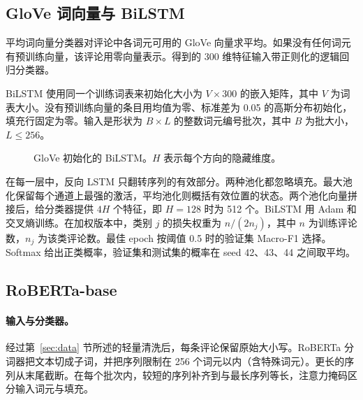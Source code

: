 \documentclass[11pt,a4paper]{article}
\begin{document}
\subsection{GloVe 词向量与 BiLSTM}
平均词向量分类器对评论中各词元可用的 GloVe 向量求平均。如果没有任何词元有预训练向量，该评论用零向量表示。得到的 300 维特征输入带正则化的逻辑回归分类器。

BiLSTM 使用同一个训练词表来初始化大小为 $V \times 300$ 的嵌入矩阵，其中 $V$ 为词表大小。没有预训练向量的条目用均值为零、标准差为 0.05 的高斯分布初始化，填充行固定为零。输入是形状为 $B \times L$ 的整数词元编号批次，其中 $B$ 为批大小，$L \leq 256$。

\begin{figure}[!htbp]
\centering
{}
\caption{GloVe 初始化的 BiLSTM。$H$ 表示每个方向的隐藏维度。}
\label{fig:bilstm}
\end{figure}

在每一层中，反向 LSTM 只翻转序列的有效部分。两种池化都忽略填充。最大池化保留每个通道上最强的激活，平均池化则概括有效位置的状态。两个池化向量拼接后，给分类器提供 $4H$ 个特征，即 $H = 128$ 时为 512 个。BiLSTM 用 Adam 和交叉熵训练。在加权版本中，类别 $j$ 的损失权重为 $n/(2n_j)$，其中 $n$ 为训练评论数，$n_j$ 为该类评论数。最佳 epoch 按阈值 0.5 时的验证集 Macro-F1 选择。Softmax 给出正类概率，验证集和测试集的概率在 seed 42、43、44 之间取平均。

\subsection{RoBERTa-base}
\paragraph{输入与分类器。}
经过第~\ref{sec:data} 节所述的轻量清洗后，每条评论保留原始大小写。RoBERTa 分词器把文本切成子词，并把序列限制在 256 个词元以内（含特殊词元）。更长的序列从末尾截断。在每个批次内，较短的序列补齐到与最长序列等长，注意力掩码区分输入词元与填充。
\end{document}
